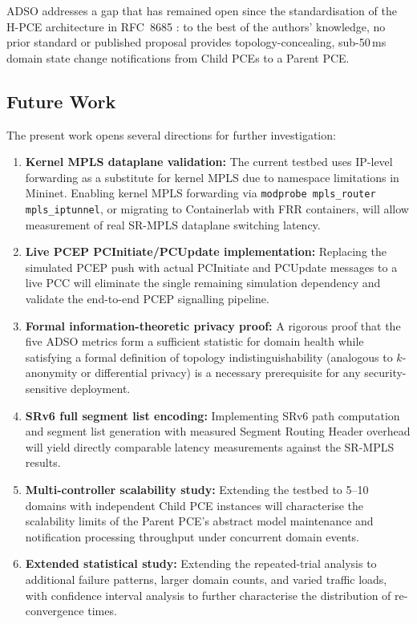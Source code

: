 \documentclass[conference]{IEEEtran}
\begin{document}
ADSO addresses a gap that has remained open since the standardisation
of the H-PCE architecture in RFC~8685 \cite{b_rfc8685}: to the best of
the authors' knowledge, no prior standard or published proposal provides
topology-concealing, sub-50\,ms domain state change notifications from
Child PCEs to a Parent PCE.

\subsection{Future Work}

The present work opens several directions for further investigation:

\begin{enumerate}
  \item \textbf{Kernel MPLS dataplane validation:} The current testbed
        uses IP-level forwarding as a substitute for kernel MPLS due
        to namespace limitations in Mininet. Enabling kernel MPLS
        forwarding via \texttt{modprobe mpls\_router mpls\_iptunnel},
        or migrating to Containerlab with FRR containers, will allow
        measurement of real SR-MPLS dataplane switching latency.

  \item \textbf{Live PCEP PCInitiate/PCUpdate implementation:}
        Replacing the simulated PCEP push with actual PCInitiate and
        PCUpdate messages to a live PCC will eliminate the single
        remaining simulation dependency and validate the end-to-end
        PCEP signalling pipeline.

  \item \textbf{Formal information-theoretic privacy proof:}
        A rigorous proof that the five ADSO metrics form a sufficient
        statistic for domain health while satisfying a formal definition
        of topology indistinguishability (analogous to $k$-anonymity
        or differential privacy) is a necessary prerequisite for any
        security-sensitive deployment.

  \item \textbf{SRv6 full segment list encoding:} Implementing SRv6
        path computation and segment list generation with measured
        Segment Routing Header overhead will yield directly comparable
        latency measurements against the SR-MPLS results.

  \item \textbf{Multi-controller scalability study:} Extending the
        testbed to 5--10 domains with independent Child PCE instances
        will characterise the scalability limits of the Parent PCE's
        abstract model maintenance and notification processing
        throughput under concurrent domain events.

  \item \textbf{Extended statistical study:} Extending the repeated-trial
        analysis to additional failure patterns, larger domain counts,
        and varied traffic loads, with confidence interval analysis to
        further characterise the distribution of re-convergence times.
\end{enumerate}
\end{document}
